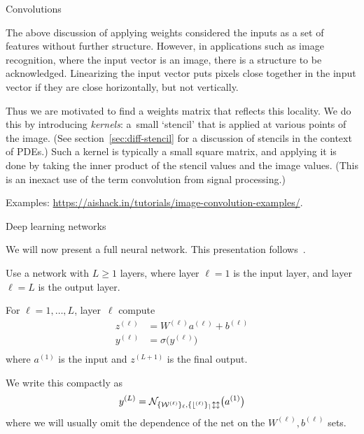  {Convolutions}

The above discussion of applying weights considered the inputs
as a set of features without further structure.
However, in applications such as image recognition,
where the input vector is an image,
there is a structure to be acknowledged.
Linearizing the input vector puts pixels close together
in the input vector if they are close horizontally,
but not vertically.

Thus we are motivated to find a weights matrix that reflects this locality.
We do this by introducing
\emph{kernels}:
a~small `stencil' that is applied at various points of the image.
(See section~\ref{sec:diff-stencil} for a discussion of
stencils in the context of \acp{PDE}.)
Such a kernel is typically a small square matrix,
and applying it is done by taking the inner product of the
stencil values and the image values.
(This is an inexact use of the term convolution from signal processing.)

Examples: \url{https://aishack.in/tutorials/image-convolution-examples/}.

 {Deep learning networks}

We will now present a full neural network.
This presentation follows~\cite{Higham:sirevDL}.

Use a network with $L \geq 1$ layers,
where layer $\ell=1$ is the input layer,
and layer $\ell=L$ is the output layer.

\newcommand\supell{^{(\ell)}}
\newcommand\supellp{^{(\ell+1)}}
\newcommand\supellm{^{(\ell-1)}}
\newcommand\calN{{\cal N}}

For $\ell=1,\ldots,L$, layer~$\ell$ compute
\begin{equation}
  \begin{array}{rl}
    z\supell &=W\supell a\supell + b\supell \\
    y\supell &= \sigma\bigl( y\supell \bigr) \\
  \end{array}
\end{equation}
where $a^{(1)}$ is the input and $z^{(L+1)}$ is the final output.

We write this compactly as
\begin{equation}
  y^{(L)} = {\cal N_{ \{W\supell\}_\ell,\{ b\supell \}_ell }}\bigl( a^{(1)} \bigr)
\end{equation}
where we will usually omit the dependence of the net on the $W\supell,b\supell$ sets.

